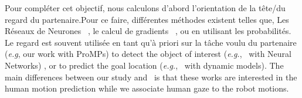 \documentclass[runningheads,a4paper]{llncs}
\begin{document}
Pour compléter cet objectif, nous calculons d'abord l'orientation de la tête/du regard du partenaire.Pour ce faire, différentes méthodes existent telles que, %
Les Réseaux de Neurones~\cite{baluja1994non} %
, le calcul de gradients~\cite{timm2011accurate}%
,  ou en utilisant les probabilités. Le regard est souvent utilisée en tant qu'à priori sur la tâche voulu du partenaire (\textit{e.g}, our work with ProMPs)
to detect the object of interest (\textit{e.g.},~\cite{HOFFMAN2006299} with Neural Networks)
, or to predict the goal location (\textit{e.g.},~\cite{chaandar2016bayesian} with dynamic models). 
The main differences between our study and~\cite{HOFFMAN2006299,chaandar2016bayesian} is that these works are interested in the human motion prediction while we associate human gaze to the robot motions.
\end{document}
